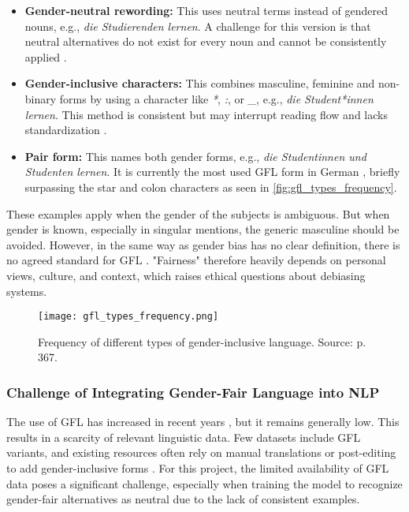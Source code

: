     \begin{itemize}
        \item \textbf{Gender-neutral rewording:}  
        This uses neutral terms instead of gendered nouns, e.g., \textit{die Studierenden lernen}. A challenge for this version is that neutral alternatives do not exist for every noun and cannot be consistently applied \parencite{lardelliBuildingBridgesDataset2024}.

        \item \textbf{Gender-inclusive characters:}  
        This combines masculine, feminine and non-binary forms by using a character like \textit{*}, \textit{:}, or \textit{\_}, e.g., \textit{die Student*innen lernen}. This method is consistent but may interrupt reading flow and lacks standardization \parencite{lardelliBuildingBridgesDataset2024}.

        \item \textbf{Pair form:}  
        This names both gender forms, e.g., \textit{die Studentinnen und Studenten lernen}. It is currently the most used GFL form in German \parencite{waldendorfWordsChangeIncrease2024}, briefly surpassing the star and colon characters as seen in \autoref{fig:gfl_types_frequency}.
    \end{itemize}

    These examples apply when the gender of the subjects is ambiguous. But when gender is known, especially in singular mentions, the generic masculine should be avoided. However, in the same way as gender bias has no clear definition, there is no agreed standard for GFL \parencite{lardelliBuildingBridgesDataset2024, savoldiDecadeGenderBias2025}. "Fairness" therefore heavily depends on personal views, culture, and context, which raises ethical questions about debiasing systems.

    \begin{figure}
        \centering
            \texttt{[image: gfl\_types\_frequency.png]}
        \caption[Frequency of different types of gender-inclusive language]{Frequency of different types of gender-inclusive language. Source: \textcite{waldendorfWordsChangeIncrease2024} p. 367.}
        \label{fig:gfl_types_frequency}
    \end{figure}

    \subsubsection{Challenge of Integrating Gender-Fair Language into NLP}
    The use of GFL has increased in recent years \parencite{waldendorfWordsChangeIncrease2024}, but it remains generally low. This results in a scarcity of relevant linguistic data. Few datasets include GFL variants, and existing resources often rely on manual translations or post-editing to add gender-inclusive forms \parencite{lardelliBuildingBridgesDataset2024}. For this project, the limited availability of GFL data poses a significant challenge, especially when training the model to recognize gender-fair alternatives as neutral due to the lack of consistent examples.

